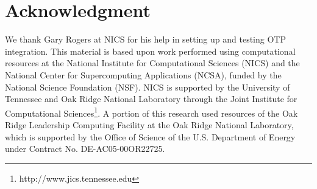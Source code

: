 \documentclass[10pt, conference, compsocconf]{IEEEtran}
\begin{document}
\section*{Acknowledgment}
We thank Gary Rogers at NICS for his help in setting up and testing OTP integration. This material is based upon work performed using computational resources at the National Institute for Computational Sciences (NICS) and the National Center for Supercomputing Applications (NCSA), funded by the National Science Foundation (NSF). NICS is supported by the University of Tennessee and Oak Ridge National Laboratory through the Joint Institute for Computational Sciences\footnote{http://www.jics.tennessee.edu}. A portion of this research used resources of the Oak Ridge Leadership Computing Facility at the Oak Ridge National Laboratory, which is supported by the Office of Science of the U.S. Department of Energy under Contract No. DE-AC05-00OR22725. 



\end{document}
